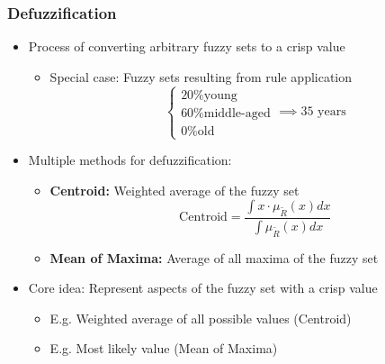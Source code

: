 \documentclass[
	10pt,
	t		%
]{beamer}
\begin{document}
\begin{frame}
	\frametitle{Defuzzification}
	\begin{itemize}
		\item Process of converting arbitrary fuzzy sets to a crisp value
		      \begin{itemize}
			      \item Special case: Fuzzy sets resulting from rule application
			            \[  \begin{cases}
					            \text{20\% young}       \\
					            \text{60\% middle-aged} \\
					            \text{0\% old}
				            \end{cases} \implies \text{35 years}
			            \]
		      \end{itemize}
		\item Multiple methods for defuzzification:
		      \begin{itemize}
			      \item \textbf{Centroid:} Weighted average of the fuzzy set
			            \[ \text{Centroid} = \frac{\int x \cdot \mu_{\tilde{R}}(x) dx}{\int \mu_{\tilde{R}}(x) dx} \]
			      \item \textbf{Mean of Maxima:} Average of all maxima of the fuzzy set
		      \end{itemize}
		\item Core idea: Represent aspects of the fuzzy set with a crisp value
		      \begin{itemize}
			      \item E.g. Weighted average of all possible values (Centroid)
			      \item E.g. Most likely value (Mean of Maxima)
		      \end{itemize}
	\end{itemize}

\end{frame}
\end{document}
